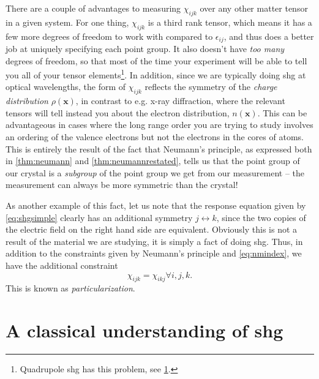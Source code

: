 There are a couple of advantages to measuring $\chi_{ijk}$ over any other matter tensor in a given system.
For one thing, $\chi_{ijk}$ is a third rank tensor, which means it has a few more degrees of freedom to work with compared to $\epsilon_{ij}$, and thus does a better job at uniquely specifying each point group.
It also doesn't have \emph{too many} degrees of freedom, so that most of the time your experiment will be able to tell you all of your tensor elements\footnote{Quadrupole \gls{shg} has this problem, see \cref{sec:manyshgterms}.}.
In addition, since we are typically doing \gls{shg} at optical wavelengths, the form of $\chi_{ijk}$ reflects the symmetry of the \emph{charge distribution} $\rho(\bm{x})$, in contrast to e.g. x-ray diffraction, where the relevant tensors will tell instead you about the electron distribution, $n(\bm{x})$.
This can be advantageous in cases where the long range order you are trying to study involves an ordering of the valence electrons but not the electrons in the cores of atoms.
This is entirely the result of the fact that Neumann's principle, as expressed both in \cref{thm:neumann} and \cref{thm:neumannrestated}, tells us that the point group of our crystal is a \emph{subgroup} of the point group we get from our measurement -- the measurement can always be more symmetric than the crystal!

As another example of this fact, let us note that the response equation given by \cref{eq:shgsimple} clearly has an additional symmetry $j \leftrightarrow k$, since the two copies of the electric field on the right hand side are equivalent.
Obviously this is not a result of the material we are studying, it is simply a fact of doing \gls{shg}.
Thus, in addition to the constraints given by Neumann's principle and \cref{eq:nmindex}, we have the additional constraint
\begin{equation}
\chi_{ijk} = \chi_{ikj} \forall i,j,k.
\end{equation}
This is known as \emph{particularization}\citep{birss}.

\section{A classical understanding of \gls{shg}}\label{sec:manyshgterms}

